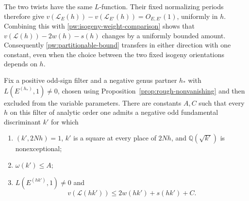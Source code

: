 The two twists have the same $L$-function. Their fixed normalizing periods
therefore give
$v(\mathcal L_E(h))-v(\mathcal L_{E'}(h))=O_{E,E'}(1)$, uniformly in $h$.
Combining this with \eqref{pw:isogeny-weight-comparison} shows that
$v(\mathcal L(h))-2w(h)-s(h)$ changes by a uniformly bounded amount.
Consequently \eqref{pw:partitionable-bound} transfers in either direction
with one constant, even when the choice between the two fixed isogeny
orientations depends on $h$.

\begin{lemma}
\label{pw:rough-companion}
Fix a positive odd-sign filter and a negative genus partner $h_*$ with
$L(E^{(h_*)},1)\ne0$, chosen using Proposition~\ref{prop:rough-nonvanishing} and then
excluded from the variable parameters.  There are constants $A,C$ such that every $h$ on this filter of analytic
order one admits a negative odd fundamental discriminant $k'$ for which
\begin{enumerate}
\item $(k',2Nh)=1$, $k'$ is a square at every place of $2Nh$, and
$\mathbb Q(\sqrt{k'})$ is nonexceptional;
\item $\omega(k')\le A$;
\item $L(E^{(hk')},1)\ne0$ and
\begin{equation}\label{pw:rough-bound}
 v(\mathcal L(hk'))\le 2w(hk')+s(hk')+C.
\end{equation}
\end{enumerate}
\end{lemma}

